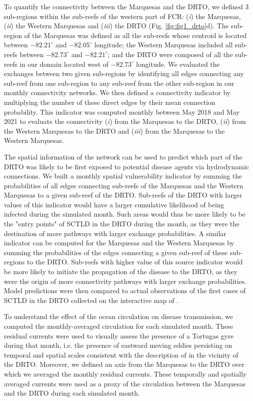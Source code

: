 To quantify the connectivity between the Marquesas and the DRTO, we defined 3 sub-regions within the sub-reefs of the western part of FCR: (\textit{i}) the Marquesas, (\textit{ii}) the Western Marquesas and (\textit{iii}) the DRTO (Fig. \ref{fig:fig1_drto}d). The sub-region of the Marquesas was defined as all the sub-reefs whose centroid is located between $-82.21^\circ$ and $-82.05^\circ$ longitude; the Western Marquesas included all sub-reefs between $-82.73^\circ$ and $-82.21^\circ$; and the DRTO were composed of  all the sub-reefs in our domain located west of $-82.73^\circ$ longitude. We evaluated the exchanges between two given sub-regions by identifying all edges connecting any sub-reef from one sub-region to any sub-reef from the other sub-region in our monthly connectivity networks. We then defined a connectivity indicator by multiplying the number of these direct edges by their mean connection probability. This indicator was computed monthly between May 2018 and May 2021 to evaluate the connectivity (\textit{i}) from the Marquesas to the DRTO, (\textit{ii}) from the Western Marquesas to the DRTO and (\textit{iii}) from the Marquesas to the Western Marquesas.

The spatial information of the network can be used to predict which part of the DRTO was likely to be first exposed to potential disease agents via hydrodynamic connections. We built a monthly spatial vulnerability indicator by summing the probabilities of all edges connecting sub-reefs of the Marquesas and the Western Marquesas to a given sub-reef of the DRTO. Sub-reefs of the DRTO with larger values of this indicator would have a larger cumulative likelihood of being infected during the simulated month. Such areas would thus be more likely to be the "entry points" of SCTLD in the DRTO during the month, as they were the destination of more pathways with larger exchange probabilities. A similar indicator can be computed for the Marquesas and the Western Marquesas by summing the probabilities of the edges connecting a given sub-reef of these sub-regions to the DRTO. Sub-reefs with higher value of this source indicator would be more likely to initiate the propagation of the disease to the DRTO, as they were the origin of more connectivity pathways with larger exchange probabilities. Model predictions were then compared to actual observations of the first cases of SCTLD in the DRTO collected on the interactive map of \cite{kramer2019map}. 

To understand the effect of the ocean circulation on disease transmission, we computed the monthly-averaged circulation for each simulated month. These residual currents were used to visually assess the presence of a Tortugas gyre during that month, i.e. the presence of eastward moving eddies persisting on temporal and spatial scales consistent with the description of \cite{lee1994evolution} in the vicinity of the DRTO. Moreover, we defined an axis from the Marquesas to the DRTO over which we averaged the monthly residual currents. These temporally and spatially averaged currents were used as a proxy of the circulation between the Marquesas and the DRTO during each simulated month.

